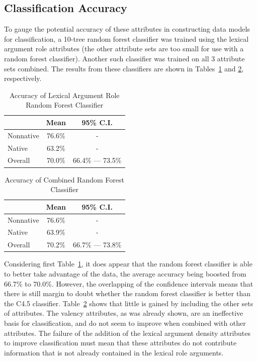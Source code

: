 \documentclass[main.tex]{subfiles}
\begin{document}
\subsection{Classification Accuracy}

To gauge the potential accuracy of these attributes in constructing data models for classification, a 10-tree random forest classifier was trained using the lexical argument role attributes (the other attribute sets are too small for use with a random forest classifier). Another such classifier was trained on all 3 attribute sets combined. The results from these classifiers are shown in Tables~\ref{table:lex-role-rf-results} and \ref{table:combined-rf-results}, respectively.
\begin{table}[htbp]
\centering
\caption{Accuracy of Lexical Argument Role Random Forest Classifier}
\begin{tabular}{l c c}
\toprule
& Mean & 95\% C.I.\\
\midrule
Nonnative & 76.6\% & - \\
[6pt]Native & 63.2\% & - \\
[6pt]Overall & 70.0\% & 66.4\% --- 73.5\% \\
\bottomrule
\end{tabular}
\label{table:lex-role-rf-results}
\end{table}
\begin{table}[htbp]
\centering
\caption{Accuracy of Combined Random Forest Classifier}
\begin{tabular}{l c c}
\toprule
& Mean & 95\% C.I.\\
\midrule
Nonnative & 76.6\% & - \\
[6pt]Native & 63.9\% & - \\
[6pt]Overall & 70.2\% & 66.7\% --- 73.8\% \\
\bottomrule
\end{tabular}
\label{table:combined-rf-results}
\end{table}
Considering first Table~\ref{table:lex-role-rf-results}, it does appear that the random forest classifier is able to better take advantage of the data, the average accuracy being boosted from 66.7\% to 70.0\%. However, the overlapping of the confidence intervals means that there is still margin to doubt whether the random forest classifier is better than the C4.5 classifier. Table~\ref{table:combined-rf-results} shows that little is gained by including the other sets of attributes. The valency attributes, as was already shown, are an ineffective basis for classification, and do not seem to improve when combined with other attributes. The failure of the addition of the lexical argument density attributes to improve classification must mean that these attributes do not contribute information that is not already contained in the lexical role arguments.
\newpage
\biblio
\end{document}

